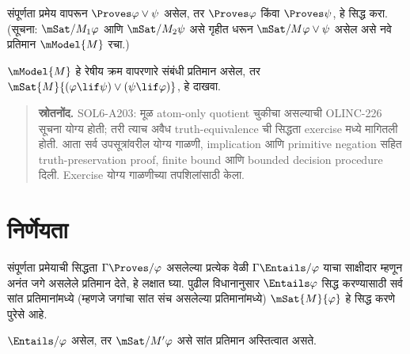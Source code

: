 \begin{prob}
  संपूर्णता प्रमेय वापरून
  $\Proves \varphi \lor \psi$ असेल,
  तर $\Proves \varphi$ किंवा
  $\Proves \psi$, हे सिद्ध करा.
  (सूचना: $\mSat/{M_1}{\varphi}$
  आणि $\mSat/{M_2}{\psi}$
  असे गृहीत धरून
  $\mSat/{M}{\varphi \lor \psi}$
  असेल असे नवे प्रतिमान
  $\mModel{M}$ रचा.)
\end{prob}

\begin{prob}
  $\mModel{M}$ हे रेषीय क्रम
  वापरणारे संबंधी प्रतिमान असेल,
  तर $\mSat{M}{(\varphi \lif \psi)\lor(\psi \lif \varphi)}$,
  हे दाखवा.
\end{prob}






\begin{quote}\small\textbf{स्रोतनोंद.} SOL6-A203: मूळ atom-only quotient चुकीचा असल्याची OLINC-226 सूचना योग्य होती; तरी त्याच अवैध truth-equivalence ची सिद्धता exercise मध्ये मागितली होती. आता सर्व उपसूत्रांवरील योग्य गाळणी, implication आणि primitive negation सहित truth-preservation proof, finite bound आणि bounded decision procedure दिली. Exercise योग्य गाळणीच्या तपशिलांसाठी केला.\end{quote}






\section{निर्णेयता}\label{int:sc:dec:sec}
संपूर्णता प्रमेयाची सिद्धता
$\Gamma \Proves/ \varphi$ असलेल्या
प्रत्येक वेळी $\Gamma \Entails/ \varphi$
याचा साक्षीदार म्हणून अनंत जगे
असलेले प्रतिमान देते, हे लक्षात घ्या.
पुढील विधानानुसार
$\Entails \varphi$ सिद्ध करण्यासाठी
सर्व सांत प्रतिमानांमध्ये (म्हणजे
जगांचा सांत संच असलेल्या प्रतिमानांमध्ये)
$\mSat{M}{\varphi}$ हे सिद्ध करणे पुरेसे आहे.

\begin{thm}\label{int:sc:dec:thm:decidability}
  $\Entails/ \varphi$ असेल, तर
  $\mSat/{M'}{\varphi}$ असे सांत प्रतिमान
  अस्तित्वात असते.
\end{thm}

